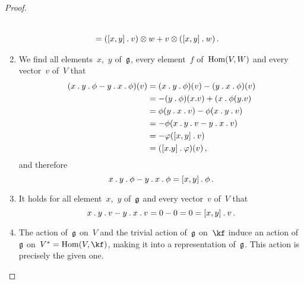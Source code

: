 \begin{proof}
\begin{enumerate}
\begin{align*}
        \\
        ={}&
        ([x,y] \mathbin{.} v) \otimes w
        + v \otimes ([x,y] \mathbin{.} w) \,.
      \end{align*}
    \item
      We find all elements~$x$,~$y$ of~$\mathfrak{g}$, every element~$f$ of~$\operatorname{Hom}(V,W)$ and every vector~$v$ of~$V$ that
      \begin{align*}
        (x \mathbin{.} y \mathbin{.} \phi - y \mathbin{.} x \mathbin{.} \phi)(v)
        &=
        (x \mathbin{.} y \mathbin{.} \phi)(v) - (y \mathbin{.} x \mathbin{.} \phi)(v)
        \\
        &=
        -(y \mathbin{.} \phi)(x.v) + (x \mathbin{.} \phi(y.v)
        \\
        &=
        \phi(y \mathbin{.} x \mathbin{.} v) - \phi(x \mathbin{.} y \mathbin{.} v)
        \\
        &=
        -\phi(x \mathbin{.} y \mathbin{.} v - y \mathbin{.} x \mathbin{.} v)
        \\
        &=
        -\varphi([x,y] \mathbin{.} v)
        \\
        &=
        ([x.y] \mathbin{.} \varphi)(v)  \,,
      \end{align*}
      and therefore
      \[
        x \mathbin{.} y \mathbin{.} \phi - y \mathbin{.} x \mathbin{.} \phi
        =
        [x,y] \mathbin{.} \phi \,.
      \]
    \item
      It holds for all element~$x$,~$y$ of~$\mathfrak{g}$ and every vector~$v$ of~$V$ that
      \[
        x \mathbin{.} y \mathbin{.} v - y \mathbin{.} x \mathbin{.} v
        =
        0 - 0
        =
        0
        =
        [x,y] \mathbin{.} v \,.
      \]
    \item
      The action of~$\mathfrak{g}$ on~$V$ and the trivial action of~$\mathfrak{g}$ on~$\kf$ induce an action of~$\mathfrak{g}$ on~$V^* = \Hom(V, \kf)$, making it into a representation of~$\mathfrak{g}$.
      This action is precisely the given one.
    \qedhere
  \end{enumerate}
\end{proof}



